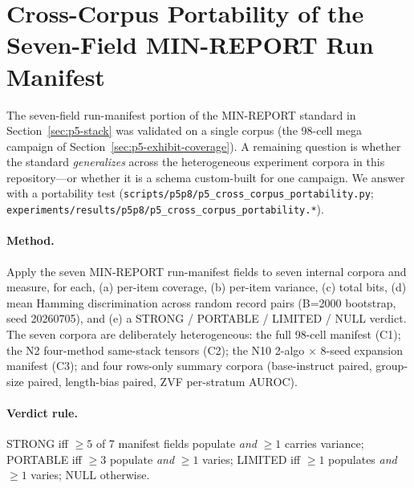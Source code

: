 \documentclass{article}  \usepackage[preprint,nonatbib]{neurips_2026} \usepackage[numbers]{natbib}
\providecommand{\secref}[1]{Section~\ref{#1}}
\begin{document}
 \section{Cross-Corpus Portability of the Seven-Field MIN-REPORT Run Manifest}
\label{sec:p5-cross-corpus}

The seven-field run-manifest portion of the MIN-REPORT standard in \secref{sec:p5-stack} was
validated on a single corpus (the 98-cell mega campaign of
\secref{sec:p5-exhibit-coverage}). A remaining question is whether
the standard \emph{generalizes} across the heterogeneous experiment
corpora in this repository---or whether it is a schema custom-built
for one campaign. We answer with a portability test
(\texttt{scripts/p5p8/p5\_cross\_corpus\_portability.py};
\texttt{experiments/results/p5p8/p5\_cross\_corpus\_portability.*}).

\paragraph{Method.}
Apply the seven MIN-REPORT run-manifest fields to seven internal corpora and
measure, for each, (a) per-item coverage, (b) per-item variance,
(c) total bits, (d) mean Hamming discrimination across random record
pairs (B=2000 bootstrap, seed 20260705), and (e) a STRONG /
PORTABLE / LIMITED / NULL verdict. The seven corpora are
deliberately heterogeneous: the full 98-cell manifest (C1); the
N2 four-method same-stack tensors (C2); the N10 2-algo $\times$
8-seed expansion manifest (C3); and four rows-only summary corpora
(base-instruct paired, group-size paired, length-bias paired, ZVF
per-stratum AUROC).

\paragraph{Verdict rule.}
STRONG iff $\geq 5$ of 7 manifest fields populate \emph{and} $\geq 1$ carries
variance; PORTABLE iff $\geq 3$ populate \emph{and} $\geq 1$
varies; LIMITED iff $\geq 1$ populates \emph{and} $\geq 1$ varies;
NULL otherwise.
\end{document}
